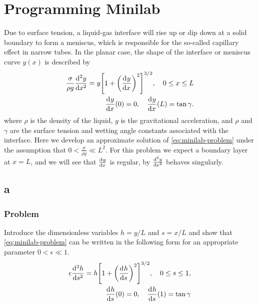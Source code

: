 \documentclass[12pt,twoside]{article}
\begin{document}
\section{Programming Minilab}
Due to surface tension, a liquid-gas interface will rise up or dip down at a
solid boundary to form a meniscus, which is responsible for the so-called
capillary effect in narrow tubes. In the planar case, the shape of the interface
or meniscus curve $y(x)$ is described by
\begin{equation}
  \label{eq:minilab-problem}
  \begin{aligned}
    \frac{\sigma}{\rho g}\od[2]{y}{x} = y {\left[ 1 + {\left( \od{y}{x}
          \right)}^2 \right]}^{3/2},\quad 0\le x\le L \\
    \od{y}{x}(0) = 0,\quad \od{y}{x}(L) = \tan\gamma.
  \end{aligned}
\end{equation}
where $\rho$ is the density of the liquid, $g$ is the gravitational
acceleration, and $\rho$ and $\gamma$ are the surface tension and wetting angle
constants associated with the interface. Here we develop an approximate solution
of \cref{eq:minilab-problem} under the assumption that $0<\frac{\sigma}{\rho
  g}\ll L^2$. For this problem we expect a boundary layer at $x=L$, and we will
see that $\od{y}{x}$ is regular, by $\od[2]{y}{x}$ behaves singularly.

\subsection{a}
\label{sec:minilab-part-a}
\subsubsection*{Problem}
Introduce the dimensionless variables $h=y/L$ and $s=x/L$ and show that
\cref{eq:minilab-problem} can be written in the following form for an
appropriate parameter $0<\epsilon\ll1$.
\begin{equation}
  \label{eq:minilab-problem-part-a}
  \begin{aligned}
    \epsilon\od[2]{h}{s} = h{\left[ 1+{\left( \od{h}{s} \right)}^2
      \right]}^{3/2},\quad 0\le s\le1, \\
    \od{h}{s}(0) = 0,\quad \od{h}{s}(1) = \tan\gamma
  \end{aligned}
\end{equation}
\end{document}
